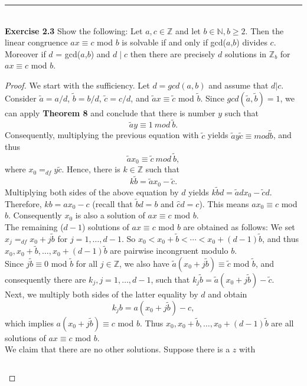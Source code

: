 \documentclass[a4paper]{article}
\begin{document}
\noindent\rule{12cm}{0.4pt}\\
\noindent \textbf{Exercise 2.3} Show the following:
Let $a, c \in \mathbb{Z}$ and let $b \in \mathbb{N}, b \geq 2$. Then the linear congruence $ax \equiv c$ mod $b$ is solvable if and only if gcd($a$,$b$) divides $c$. Moreover if $d$ = gcd($a$,$b$) and $d \mid c$ then there are precisely $d$ solutions in $\mathbb{Z}_{b}$ for $ax \equiv c$ mod $b$.
\begin{proof}
We start with the sufficiency. Let $d = gcd(a,b)$ and assume that $d|c$. Consider $\tilde{a} = a/d$, $\tilde{b} = b/d$, $\tilde{c} = c/d$, and $\tilde{a}x \equiv \tilde{c}$ mod $\tilde{b}$. Since $gcd(\tilde{a}, \tilde{b}) = 1$, we can apply \textbf{Theorem 8} and conclude that there is number $y$ such that
$$\tilde{a}y \equiv 1\ mod\ \tilde{b}.$$
Consequently, multiplying the previous equation with $\tilde{c}$ yields $\tilde{a}y\tilde{c} \equiv mod \tilde{b}$, and thus
$$\tilde{a}x_{0} \equiv \tilde{c}\ mod\ \tilde{b},$$
where $x_{0} =_{df} y\tilde{c}$. Hence, there is $k \in \mathbb{Z}$ such that
$$k\tilde{b} = \tilde{a}x_{0} - \tilde{c}.$$
Multiplying both sides of the above equation by $d$ yields $k\tilde{b}d = \tilde{a}dx_{0} - \tilde{c}d$. Therefore, $kb = ax_{0} - c$ (recall that $\tilde{b}d = b$ and $\hat{c}d = c$). This means $ax_{0} \equiv c$ mod $b$. Consequently $x_{0}$ is also a solution of $ax \equiv c$ mod $b$.\\
The remaining ($d - 1$) solutions of $ax \equiv c$ mod $b$ are obtained as follows: We set $x_{j} =_{df} x_{0} + j\tilde{b}$ for $j = 1, \ldots, d - 1$. So $x_{0} < x_{0} + \tilde{b} < \cdots < x_{0} + (d - 1)\tilde{b}$, and thus $x_{0}, x_{0} + \tilde{b}, \ldots, x_{0} + (d - 1)\tilde{b}$ are pairwise incongruent modulo $b$.\\
Since $j\tilde{b} \equiv 0$ mod $\tilde{b}$ for all $j \in \mathbb{Z}$, we also have $\tilde{a}(x_{0}+j\tilde{b}) \equiv \tilde{c}$ mod $\tilde{b}$, and consequently there are $k_{j}, j = 1, \ldots, d-1$, such that $k_{j}\tilde{b} = \tilde{a}(x_{0}+j\tilde{b}) - \tilde{c}$.\\
Next, we multiply both sides of the latter equality by $d$ and obtain
$$ k_{j}b = a(x_{0} + j\tilde{b}) - c,$$
which implies $a(x_{0} + j \tilde{b}) \equiv c$ mod $b$. Thus $x_{0}, x_{0} + \tilde{b}, \ldots, x_{0} + (d - 1)\tilde{b}$ are all solutions of $ax \equiv c$ mod $b$.\\
We claim that there are no other solutions. Suppose there is a $z$ with
\begin{center}
\begin{tabular}{c c c}

\end{tabular}
\end{center}
\end{proof}
\end{document}
